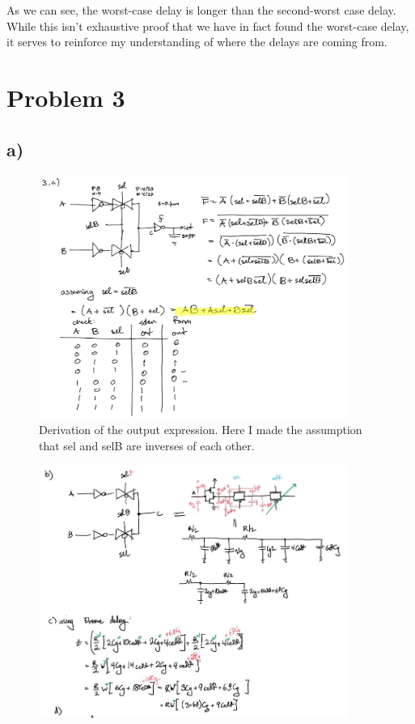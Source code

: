 \documentclass[11pt]{article}
\begin{document}
As we can see, the worst-case delay is longer than the second-worst case delay. While this isn't exhaustive proof that we have in fact found the worst-case delay, it serves to reinforce my understanding of where the delays are coming from.

\section{Problem 3}
\subsection{a)}

\begin{figure}[H]
\centering
  \includegraphics[width=0.9\textwidth]{q3.png}
  \caption{Derivation of the output expression. Here I made the assumption that sel and selB are inverses of each other.}
\end{figure}


\begin{figure}[H]
\centering
  \includegraphics[width=0.9\textwidth]{delay1.jpg}
\end{figure}
\end{document}
